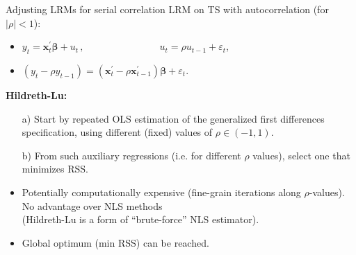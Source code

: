 \documentclass{beamer}
\begin{document}
\begin{frame}{Adjusting LRMs for serial correlation}
LRM on TS with autocorrelation (for $|\rho|<1$):\\ \medskip
\begin{itemize}
    \item $y_t=\bm{x}_t^{\prime} \bm{\beta} + u_t \,,\qquad \qquad \qquad~~~~~~~\, u_t = \rho u_{t-1}+\varepsilon_t$,
    \item $(y_t - \rho y_{t-1}) =  ( \bm{x}_t^{\prime} - \rho \bm{x}_{t-1}^{\prime}) \bm{\beta} + \varepsilon_t$.
\end{itemize}
\medskip
\textbf{Hildreth-Lu:} \\ \medskip
\begin{itemize}
    \item[a)] Start by repeated OLS estimation of the generalized first differences specification, using different (fixed) values of $\rho \in (-1,1)$. 
    \item[b)] From such auxiliary regressions (i.e. for different $\rho$ values), select one that minimizes RSS.
    \medskip
    \item Potentially computationally expensive (fine-grain iterations along $\rho$-values). No advantage over NLS methods \\(Hildreth-Lu is a form of ``brute-force'' NLS estimator).
    \item Global optimum (min RSS) can be reached.
\end{itemize}
\end{frame}
\end{document}
